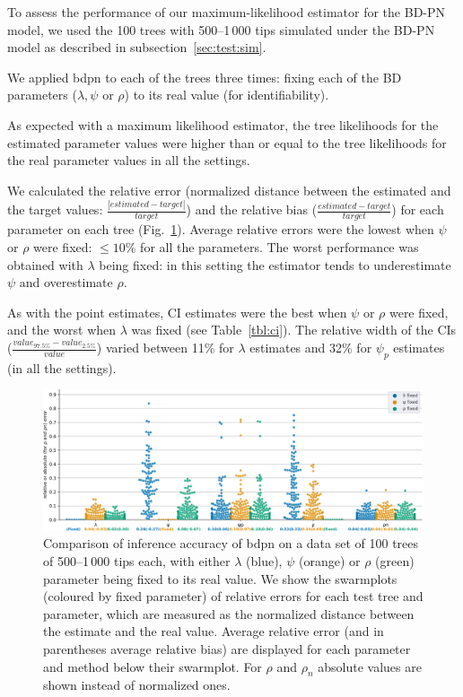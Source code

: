 \documentclass[a4paper,10pt]{article}
\begin{document}
To assess the performance of our maximum-likelihood estimator for the BD-PN model, we used the 100 trees with 500--1\,000 tips simulated under the BD-PN model as described in subsection~\ref{sec:test:sim}.

We applied bdpn to each of the trees three times: fixing each of the BD parameters ($\lambda,\psi$ or $\rho$) to its real value (for identifiability). 


As expected with a maximum likelihood estimator, the tree likelihoods for the estimated parameter values were higher than or equal to the tree likelihoods for the real parameter values in all the settings.

We calculated the relative error (normalized distance between the estimated and the target values: $\frac{|estimated - target|}{target}$) and the relative bias ($\frac{estimated - target}{target}$) for each parameter on each tree (Fig.~\ref{fig:sim}). 
Average relative errors were the lowest when $\psi$ or $\rho$ were fixed: $\leq 10\%$  for all the parameters. The worst performance was obtained with $\lambda$ being fixed: in this setting the estimator tends to underestimate $\psi$ and overestimate $\rho$.

As with the point estimates, CI estimates were the best when $\psi$ or $\rho$ were fixed, and the worst when $\lambda$ was fixed (see Table~\ref{tbl:ci}). The relative width of the CIs ($\frac{value_{97.5\%} - value_{2.5\%}}{value}$) varied between 11\% for $\lambda$ estimates and 32\% for $\psi_p$ estimates (in all the settings).

\begin{figure}[!pht]
\centering 
\includegraphics[width=1\textwidth]{Fig_errors.eps}
\caption{Comparison of inference accuracy of bdpn on a data set of 100 trees of 500--1\,000 tips each, with either $\lambda$ (blue), $\psi$ (orange) or $\rho$ (green) parameter being fixed to its real value.
We show the swarmplots (coloured by fixed parameter) of relative errors for each test tree and parameter, which are measured as the normalized distance between the estimate and the real value. Average relative error (and in parentheses average relative bias) are displayed for each parameter and method below their swarmplot. For $\rho$ and $\rho_n$ absolute values are shown instead of normalized ones. } 
\label{fig:sim} 
\end{figure}
 
\end{document}
